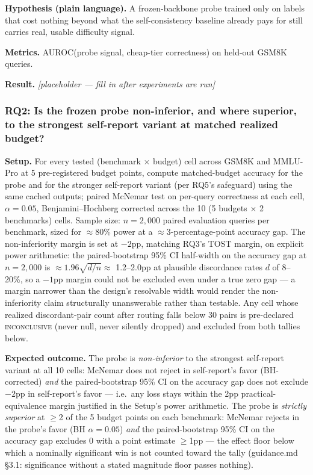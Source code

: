 \documentclass[11pt]{article}
\newcommand{\ph}{\textit{[placeholder --- fill in after experiments are run]}}
\begin{document}
\textbf{Hypothesis (plain language).} A frozen-backbone probe trained only on labels that cost nothing beyond what the self-consistency baseline already pays for still carries real, usable difficulty signal.

\textbf{Metrics.} AUROC(probe signal, cheap-tier correctness) on held-out GSM8K queries.

\textbf{Result.} \ph

\subsubsection{RQ2: Is the frozen probe non-inferior, and where superior, to the strongest self-report variant at matched realized budget?}
\textbf{Setup.} For every tested (benchmark $\times$ budget) cell across GSM8K and MMLU-Pro at 5 pre-registered budget points, compute matched-budget accuracy for the probe and for the stronger self-report variant (per RQ5's safeguard) using the same cached outputs; paired McNemar test on per-query correctness at each cell, $\alpha=0.05$, Benjamini--Hochberg corrected across the 10 (5 budgets $\times$ 2 benchmarks) cells. Sample size: $n=2{,}000$ paired evaluation queries per benchmark, sized for $\approx$80\% power at a $\approx$3-percentage-point accuracy gap. The non-inferiority margin is set at $-2$pp, matching RQ3's TOST margin, on explicit power arithmetic: the paired-bootstrap 95\% CI half-width on the accuracy gap at $n=2{,}000$ is $\approx 1.96\sqrt{d/n} \approx$ 1.2--2.0pp at plausible discordance rates $d$ of 8--20\%, so a $-1$pp margin could not be excluded even under a true zero gap --- a margin narrower than the design's resolvable width would render the non-inferiority claim structurally unanswerable rather than testable. Any cell whose realized discordant-pair count after routing falls below 30 pairs is pre-declared \textsc{inconclusive} (never null, never silently dropped) and excluded from both tallies below.

\textbf{Expected outcome.} The probe is \emph{non-inferior} to the strongest self-report variant at all 10 cells: McNemar does not reject in self-report's favor (BH-corrected) \emph{and} the paired-bootstrap 95\% CI on the accuracy gap does not exclude $-2$pp in self-report's favor --- i.e.\ any loss stays within the 2pp practical-equivalence margin justified in the Setup's power arithmetic. The probe is \emph{strictly superior} at $\geq$2 of the 5 budget points on each benchmark: McNemar rejects in the probe's favor (BH $\alpha=0.05$) \emph{and} the paired-bootstrap 95\% CI on the accuracy gap excludes 0 with a point estimate $\geq$1pp --- the effect floor below which a nominally significant win is not counted toward the tally (guidance.md \S3.1: significance without a stated magnitude floor passes nothing).
\end{document}
